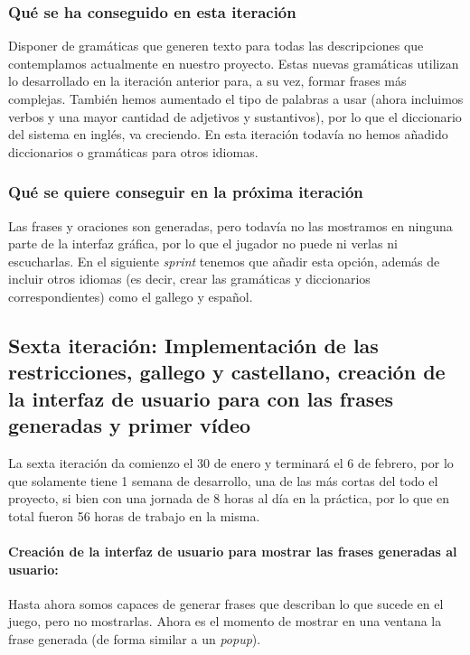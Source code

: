 \subsubsection{Qué se ha conseguido en esta iteración}

Disponer de gramáticas que generen texto para todas las descripciones que contemplamos actualmente en nuestro proyecto. Estas nuevas gramáticas utilizan lo desarrollado en la iteración anterior para, a su vez, formar frases más complejas. También hemos aumentado el tipo de palabras a usar (ahora incluimos verbos y una mayor cantidad de adjetivos y sustantivos), por lo que el diccionario del sistema en inglés, va creciendo. En esta iteración todavía no hemos añadido diccionarios o gramáticas para otros idiomas.

\subsubsection{Qué se quiere conseguir en la próxima iteración}

Las frases y oraciones son generadas, pero todavía no las mostramos en ninguna parte de la interfaz gráfica, por lo que el jugador no puede ni verlas ni escucharlas. En el siguiente \textit{sprint} tenemos que añadir esta opción, además de incluir otros idiomas (es decir, crear las gramáticas y diccionarios correspondientes) como el gallego y español.

\subsection{Sexta iteración: Implementación de las restricciones, gallego y castellano, creación de la interfaz de usuario para con las frases generadas y primer vídeo}

La sexta iteración da comienzo el 30 de enero y terminará el 6 de febrero, por lo que solamente tiene 1 semana de desarrollo, una de las más cortas del todo el proyecto, si bien con una jornada de 8 horas al día en la práctica, por lo que en total fueron 56 horas de trabajo en la misma.

\paragraph{Creación de la interfaz de usuario para mostrar las frases generadas al usuario:} Hasta ahora somos capaces de generar frases que describan lo que sucede en el juego, pero no mostrarlas. Ahora es el momento de mostrar en una ventana la frase generada (de forma similar a un \textit{popup}).

